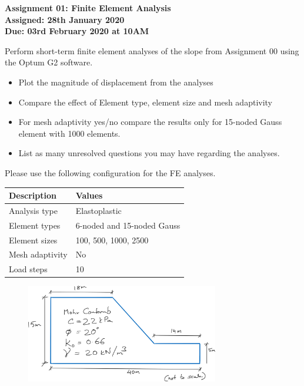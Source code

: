 \documentclass[a4paper,12pt]{article}
\begin{document}
\begin{centering}
	\textbf{
		Assignment 01: Finite Element Analysis\\
		Assigned: 28th January 2020\\
		Due: 03rd February 2020 at 10AM\\
	}
\end{centering}

\vspace{1em}
 
Perform short-term finite element analyses of the slope from Assignment 00 using the Optum G2 software. 

\begin{itemize}
	\item Plot the magnitude of displacement from the analyses
	\item Compare the effect of Element type, element size and mesh adaptivity
	\item For mesh adaptivity yes/no compare the results only for 15-noded Gauss element with 1000 elements.
	\item List as many unresolved questions you may have regarding the analyses.
\end{itemize}

Please use the following configuration for the FE analyses. 

\begin{table}[!h]
	\centering
	\begin{tabular}{ll}
		\toprule
		\textbf{Description}     & \textbf{Values} \\
		\midrule
		Analysis type & Elastoplastic\\
		Element types  &   6-noded and 15-noded Gauss\\
		Element sizes   & 100, 500, 1000, 2500    \\
		Mesh adaptivity & No\\
		Load steps & 10 \\
		\bottomrule
	\end{tabular}
\end{table}

\begin{figure}[!h]
	\centering
	\includegraphics[width=0.75\textwidth]{figs/slope.png}
\end{figure}


	
\end{document}
